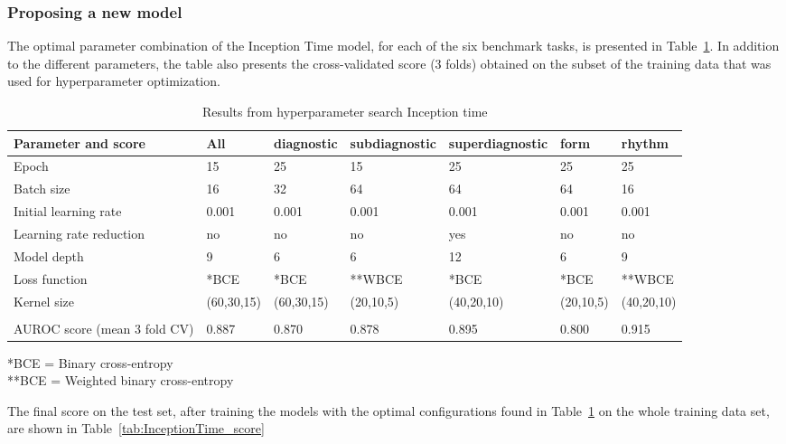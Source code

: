 \subsubsection{Proposing a new model}
The optimal parameter combination of the Inception Time model, for each of the six benchmark tasks, is presented in Table~\ref{tab:HPsearch}. In addition to the different parameters, the table also presents the cross-validated score (3 folds) obtained on the subset of the training data that was used for hyperparameter optimization. 


\begin{table}[hp]
\scriptsize
\centering
\caption{Results from hyperparameter search Inception time }
\begin{tabular}{lllllll}
\cellcolor[HTML]{C0C0C0}\textbf{Parameter and score } & \cellcolor[HTML]{C0C0C0}\textbf{All} &
\cellcolor[HTML]{C0C0C0}\textbf{diagnostic} &
\cellcolor[HTML]{C0C0C0}\textbf{subdiagnostic} &
\cellcolor[HTML]{C0C0C0}\textbf{superdiagnostic} &
\cellcolor[HTML]{C0C0C0}\textbf{form} &
\cellcolor[HTML]{C0C0C0}\textbf{rhythm} \\\hline
Epoch        & 15& 25& 15& 25& 25& 25 \\
Batch size        & 16& 32& 64& 64& 64 & 16  \\
Initial learning rate      & 0.001& 0.001& 0.001& 0.001& 0.001 & 0.001 \\
Learning rate reduction        & no& no& no& yes& no& no  \\
Model depth                & 9& 6& 6& 12& 6& 9 \\
Loss function          & *BCE& *BCE& **WBCE& *BCE& *BCE& **WBCE  \\
Kernel size     & (60,30,15)& (60,30,15)& (20,10,5)& (40,20,10)& (20,10,5)& (40,20,10)  \\\\
AUROC score (mean 3 fold CV)    & 0.887& 0.870& 0.878& 0.895& 0.800& 0.915  \\\hline 
\end{tabular}
\raggedright
*BCE = Binary cross-entropy\\
**BCE = Weighted binary cross-entropy
\label{tab:HPsearch}
\end{table}

The final score on the test set, after training the models with the optimal configurations found in Table~\ref{tab:HPsearch} on the whole training data set, are shown in Table~\ref{tab:InceptionTime_score} 


